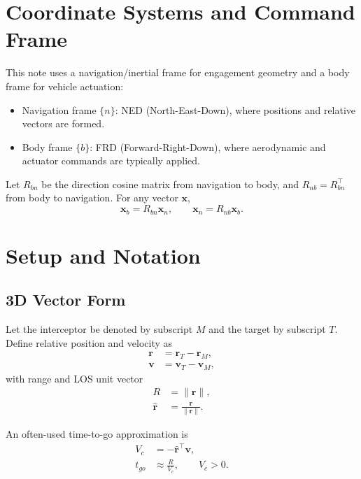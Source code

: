 \documentclass[11pt,a4paper]{article}
\begin{document}
\section{Coordinate Systems and Command Frame}
This note uses a navigation/inertial frame for engagement geometry and a body frame for vehicle actuation:
\begin{itemize}
    \item Navigation frame $\{n\}$: NED (North-East-Down), where positions and relative vectors are formed.
    \item Body frame $\{b\}$: FRD (Forward-Right-Down), where aerodynamic and actuator commands are typically applied.
\end{itemize}

Let $R_{bn}$ be the direction cosine matrix from navigation to body, and $R_{nb}=R_{bn}^\top$ from body to navigation.
For any vector $\mathbf{x}$,
\begin{equation}
\mathbf{x}_b = R_{bn}\mathbf{x}_n, \qquad \mathbf{x}_n = R_{nb}\mathbf{x}_b.
\end{equation}

\section{Setup and Notation}
\subsection{3D Vector Form}
Let the interceptor be denoted by subscript $M$ and the target by subscript $T$.
Define relative position and velocity as
\begin{align}
\mathbf{r} &= \mathbf{r}_T - \mathbf{r}_M, \\
\mathbf{v} &= \mathbf{v}_T - \mathbf{v}_M,
\end{align}
with range and LOS unit vector
\begin{align}
R &= \lVert \mathbf{r} \rVert, \\
\hat{\mathbf{r}} &= \frac{\mathbf{r}}{\lVert \mathbf{r} \rVert}.
\end{align}

An often-used time-to-go approximation is
\begin{align}
V_c &= -\hat{\mathbf{r}}^\top \mathbf{v}, \\
t_{go} &\approx \frac{R}{V_c}, \qquad V_c > 0.
\end{align}
\end{document}

